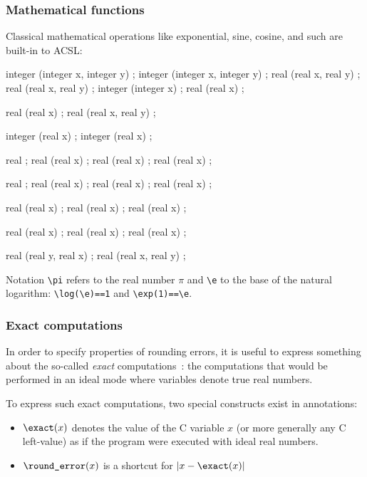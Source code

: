 \subsubsection{Mathematical functions}

Classical mathematical operations like exponential, sine, cosine, and
such are built-in to ACSL:

\begin{listing-nonumber}
integer \min(integer x, integer y) ;
integer \max(integer x, integer y) ;
real \min(real x, real y) ;
real \max(real x, real y) ;
integer \abs(integer x) ;
real \abs(real x) ;

real \sqrt(real x) ;
real \pow(real x, real y) ;

integer \ceil(real x) ;
integer \floor(real x) ;

real \e ;
real \exp(real x) ;
real \log(real x) ;
real (real x) ;

real \pi ;
real \cos(real x) ;
real \sin(real x) ;
real \tan(real x) ;

real \cosh(real x) ;
real \sinh(real x) ;
real \tanh(real x) ;

real \acos(real x) ;
real \asin(real x) ;
real \atan(real x) ;

real (real y, real x) ;
real \hypot(real x, real y) ;
\end{listing-nonumber}

Notation \lstinline|\pi| refers to the real number $\pi$ and \lstinline|\e| to
the base of the natural logarithm: \lstinline|\log(\e)==1| and \lstinline|\exp(1)==\e|.

\subsubsection{Exact computations}

In order to specify properties of rounding errors, it is useful to express
something about the so-called \emph{exact}
computations~\cite{BoldoFilliatre07}: the computations that would be performed
in an ideal mode where variables denote true real numbers.

To express such exact computations, two special
constructs exist in annotations:
\begin{itemize}
\item $\verb|\exact|(x)$ denotes the value of the C variable $x$ (or
  more generally any C left-value) as if the program were executed with
  ideal real numbers.
\item $\verb|\round_error|(x)$ is a shortcut for $|x-\verb|\exact|(x)|$
\end{itemize}

